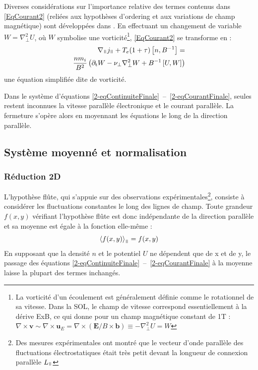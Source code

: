 \begin{refsection}
Diverses considérations sur l'importance relative des termes contenus dans
\eqref{EqCourant2} (reliées aux hypothèses d'ordering
et aux variations de champ magnétique) sont développées dans
\cite{SarazinPhD}. En effectuant un changement de variable $W=\nabla_\perp^2U$, où $W$ symbolise
une vorticité\footnote{La vorticité d'un écoulement est généralement définie comme le rotationnel de sa vitesse. Dans la SOL, le champ de vitesse correspond essentiellement à la dérive ExB, ce qui donne pour un
champ magnétique constant de 1T : 
$\nabla\times\mathbf{v}\sim\nabla\times\mathbf{u}_E=\nabla\times(\mathbf{E}/B\times\mathbf{b})\equiv-\nabla_\perp^2
U=W$ }, \eqref{EqCourant2} se transforme en :
\begin{equation}\begin{split}
\label{2-eqCourantFinale}
\nabla_\para{j}_\para +
T_e(1+\tau)\left[n,B\puissance{-1}\right] =\\
\frac{nm_i}{B^2}\left(\partial_\text{t}W - \nu_\perp
\nabla_\perp^2W+
B\puissance{-1}\left[U,W\right]\right)
\end{split}
\end{equation}
une équation simplifiée dite de vorticité. 

 Dans le système d'équations
 \eqref{2-eqContinuiteFinale}~--~\eqref{2-eqCourantFinale}, seules restent
 inconnues la vitesse parallèle électronique  et le courant parallèle. La
 fermeture s'opère alors en moyennant les équations le long de la direction
 parallèle. 

\subsection{Système moyenné et normalisation}
\label{2-flute}
\subsubsection{Réduction 2D}

 L'hypothèse flûte, qui s'appuie sur des observations
expérimentales\footnote{Des mesures expérimentales ont montré que le vecteur
d'onde parallèle des fluctuations électrostatiques était très petit devant la
longueur de connexion parallèle $L_\para$\parencite{Wootton}}, consiste à
considérer les fluctuations constantes le long des lignes de champ. Toute grandeur $f(x,y)$
vérifiant l'hypothèse flûte est donc indépendante de la direction parallèle et
sa moyenne est égale à la fonction elle-même :
\begin{equation}
\left<f(x,y)\right>_\para=f(x,y)
\end{equation}
En supposant que la densité $n$ et le potentiel $U$ ne dépendent que de x et de
y, le passage des équations
\eqref{2-eqContinuiteFinale}~--~\eqref{2-eqCourantFinale} à la moyenne laisse
la plupart des termes inchangés.


\end{refsection}
